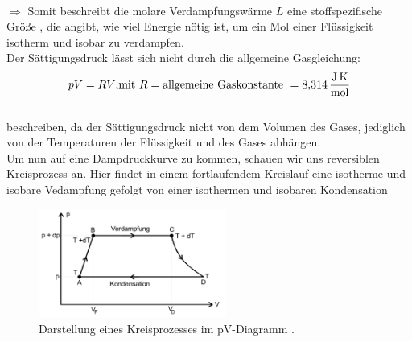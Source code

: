 \\$\Rightarrow$ Somit beschreibt die molare Verdampfungswärme $L$ eine stoffspezifische Größe , die angibt, wie viel Energie nötig ist,
um ein Mol einer Flüssigkeit isotherm und isobar zu verdampfen.\\
Der Sättigungsdruck lässt sich nicht durch die allgemeine Gasgleichung:
\begin{equation}
    pV=RV\text{,mit }R=\text{allgemeine Gaskonstante }= \SI{8.314}{\joule\per\mole\kelvin}\\
    \label{eqn:Gasgl}
\end{equation}
\\
beschreiben, da der Sättigungsdruck nicht von dem Volumen des Gases, jediglich von der Temperaturen der Flüssigkeit 
und des Gases abhängen.
\\
Um nun auf eine Dampdruckkurve zu kommen, schauen wir uns reversiblen Kreisprozess an. Hier findet in einem fortlaufendem 
Kreislauf eine isotherme und isobare Vedampfung gefolgt von einer isothermen und isobaren Kondensation\\

\begin{figure}[H]
    \centering
    \includegraphics[width=0.55\textwidth]{images/Kreislauf.PNG}
    \caption{Darstellung eines Kreisprozesses im pV-Diagramm \protect \cite{V203}.}
    \label{img:Kreislauf}
\end{figure}

